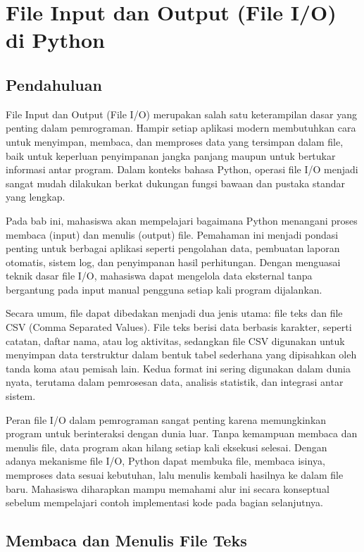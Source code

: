\chapter{File Input dan Output (File I/O) di Python}

\section{Pendahuluan}

File Input dan Output (File I/O) merupakan salah satu keterampilan dasar yang penting dalam pemrograman. Hampir setiap aplikasi modern membutuhkan cara untuk menyimpan, membaca, dan memproses data yang tersimpan dalam file, baik untuk keperluan penyimpanan jangka panjang maupun untuk bertukar informasi antar program. Dalam konteks bahasa Python, operasi file I/O menjadi sangat mudah dilakukan berkat dukungan fungsi bawaan dan pustaka standar yang lengkap.

Pada bab ini, mahasiswa akan mempelajari bagaimana Python menangani proses membaca (input) dan menulis (output) file. Pemahaman ini menjadi pondasi penting untuk berbagai aplikasi seperti pengolahan data, pembuatan laporan otomatis, sistem log, dan penyimpanan hasil perhitungan. Dengan menguasai teknik dasar file I/O, mahasiswa dapat mengelola data eksternal tanpa bergantung pada input manual pengguna setiap kali program dijalankan.

Secara umum, file dapat dibedakan menjadi dua jenis utama: file teks dan file CSV (Comma Separated Values). File teks berisi data berbasis karakter, seperti catatan, daftar nama, atau log aktivitas, sedangkan file CSV digunakan untuk menyimpan data terstruktur dalam bentuk tabel sederhana yang dipisahkan oleh tanda koma atau pemisah lain. Kedua format ini sering digunakan dalam dunia nyata, terutama dalam pemrosesan data, analisis statistik, dan integrasi antar sistem.

Peran file I/O dalam pemrograman sangat penting karena memungkinkan program untuk berinteraksi dengan dunia luar. Tanpa kemampuan membaca dan menulis file, data program akan hilang setiap kali eksekusi selesai. Dengan adanya mekanisme file I/O, Python dapat membuka file, membaca isinya, memproses data sesuai kebutuhan, lalu menulis kembali hasilnya ke dalam file baru. Mahasiswa diharapkan mampu memahami alur ini secara konseptual sebelum mempelajari contoh implementasi kode pada bagian selanjutnya.


\section{Membaca dan Menulis File Teks}

